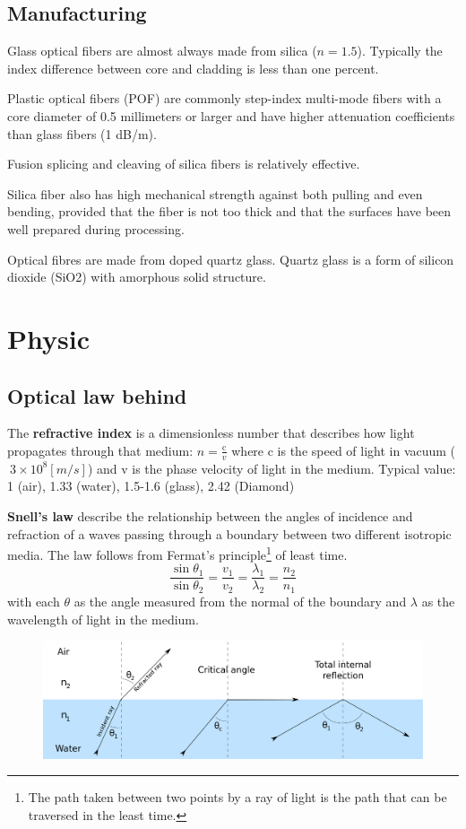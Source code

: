 \documentclass[twocolumn]{article}
\numberwithin{equation}{section}
\begin{document}
	\subsection{Manufacturing}
Glass optical fibers are almost always made from silica ($n=1.5$). Typically the index difference between core and cladding is less than one percent.

Plastic optical fibers (POF) are commonly step-index multi-mode fibers with a core diameter of 0.5 millimeters or larger and have higher attenuation coefficients than glass fibers (1 dB/m).

Fusion splicing and cleaving of silica fibers is relatively effective.
 
 Silica fiber also has high mechanical strength against both pulling and even bending, provided that the fiber is not too thick and that the surfaces have been well prepared during processing.

Optical fibres are made from doped quartz glass. Quartz glass is a form of silicon dioxide (SiO2) with amorphous solid structure.


\section{Physic}
	\subsection{Optical law behind}
The \textbf{refractive index} is a dimensionless number that describes how light propagates through that medium: $n=\frac{\mathrm{c}}{v}$
where c is the speed of light in vacuum ($~3\times 10^8 [m/s]$) and v is the phase velocity of light in the medium. Typical value: 1 (air), 1.33 (water), 1.5-1.6 (glass), 2.42 (Diamond) 


\textbf{Snell's law} describe the relationship between the angles of incidence and refraction of a waves passing through a boundary between two different isotropic media. The law follows from Fermat's principle\footnote{The path taken between two points by a ray of light is the path that can be traversed in the least time.} of least time.
$$\frac{\sin\theta_1}{\sin\theta_2} = \frac{v_1}{v_2} = \frac{\lambda_1}{\lambda_2} = \frac{n_2}{n_1}$$
with each $\theta$ as the angle measured from the normal of the boundary and $\lambda$ as the wavelength of light in the medium. 
\begin{figure}[H]
	\centering
	\includegraphics[width=.5\textwidth]{1920px-RefractionReflextion.png}
\end{figure}
\end{document}
